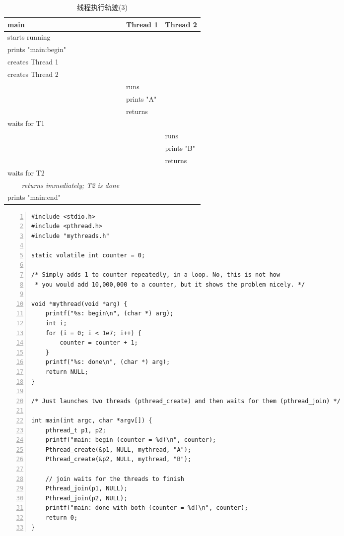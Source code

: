 \begin{table}[p]
\vspace{0.5cm}
{\scriptsize
\begin{tabular}{p{5cm} l l}
\textbf{main}&\textbf{Thread 1}&\textbf{Thread 2}\\ \midrule[1.1pt]
starts running &  & \\
prints "main:begin" &  & \\
creates Thread 1&  &  \\
creates Thread 2&  &  \\
  & runs &  \\
  & prints "A" &  \\
  & returns &  \\
waits for T1 &  &  \\
  &  & runs \\
  &  & prints "B" \\
  &  & returns \\
waits for T2 &  &  \\
\textsl{~~~~returns immediately; T2 is done} &  & \\
prints "main:end" &  &  \\
\end{tabular}}
\caption{\footnotesize 线程执行轨迹(3)}\color{black}\label{tab26-1}
\end{table}
\clearpage

\begin{lstlisting}[numbers=left,stepnumber=1,numberstyle=\footnotesize]
#include <stdio.h>
#include <pthread.h>
#include "mythreads.h"

static volatile int counter = 0;

/* Simply adds 1 to counter repeatedly, in a loop. No, this is not how 
 * you would add 10,000,000 to a counter, but it shows the problem nicely. */

void *mythread(void *arg) {
    printf("%s: begin\n", (char *) arg);
    int i;
    for (i = 0; i < 1e7; i++) {
        counter = counter + 1;
    }
    printf("%s: done\n", (char *) arg);
    return NULL;
}

/* Just launches two threads (pthread_create) and then waits for them (pthread_join) */

int main(int argc, char *argv[]) {
    pthread_t p1, p2;
    printf("main: begin (counter = %d)\n", counter);
    Pthread_create(&p1, NULL, mythread, "A");
    Pthread_create(&p2, NULL, mythread, "B");

    // join waits for the threads to finish
    Pthread_join(p1, NULL);
    Pthread_join(p2, NULL);
    printf("main: done with both (counter = %d)\n", counter);
    return 0;
}
\end{lstlisting}

